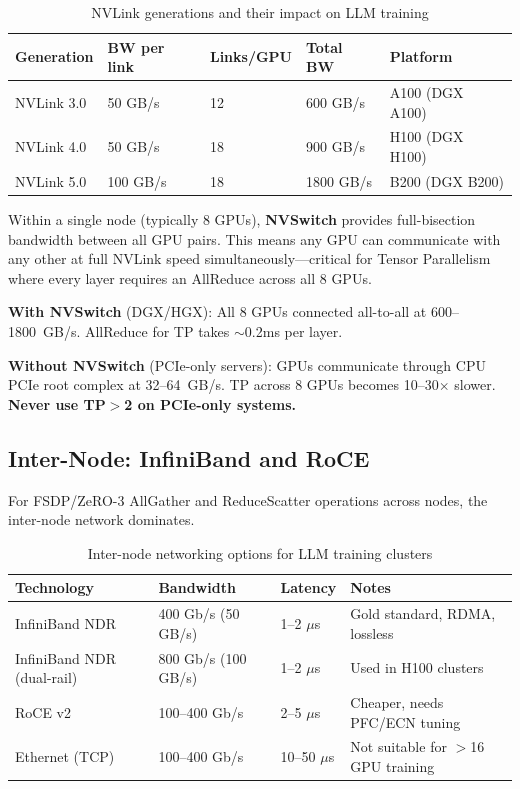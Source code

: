 \begin{table}[ht!]
\centering
\caption{NVLink generations and their impact on LLM training}
\begin{tabular}{@{}lp{3cm}p{3.2cm}p{3.2cm}p{3.5cm}@{}}
\toprule
\textbf{Generation} & \textbf{BW per link} & \textbf{Links/GPU} & \textbf{Total BW} & \textbf{Platform} \\
\midrule
NVLink 3.0 & 50 GB/s & 12 & 600 GB/s & A100 (DGX A100) \\
NVLink 4.0 & 50 GB/s & 18 & 900 GB/s & H100 (DGX H100) \\
NVLink 5.0 & 100 GB/s & 18 & 1800 GB/s & B200 (DGX B200) \\
\bottomrule
\end{tabular}
\end{table}

Within a single node (typically 8 GPUs), \textbf{NVSwitch} provides full-bisection bandwidth between all GPU pairs. This means any GPU can communicate with any other at full NVLink speed simultaneously---critical for Tensor Parallelism where every layer requires an AllReduce across all 8 GPUs.

\begin{keybox}
\textbf{With NVSwitch} (DGX/HGX): All 8 GPUs connected all-to-all at 600--1800~GB/s. AllReduce for TP takes $\sim$0.2ms per layer.

\textbf{Without NVSwitch} (PCIe-only servers): GPUs communicate through CPU PCIe root complex at 32--64~GB/s. TP across 8 GPUs becomes 10--30$\times$ slower. \textbf{Never use TP$>$2 on PCIe-only systems.}
\end{keybox}

\subsection{Inter-Node: InfiniBand and RoCE}
\label{inter-node-infiniband-and-roce}

For FSDP/ZeRO-3 AllGather and ReduceScatter operations across nodes, the inter-node network dominates.

\begin{table}[ht!]
\centering
\caption{Inter-node networking options for LLM training clusters}
{\small
\begin{tabular}{@{}llll@{}}
\toprule
\textbf{Technology} & \textbf{Bandwidth} & \textbf{Latency} & \textbf{Notes} \\
\midrule
InfiniBand NDR & 400 Gb/s (50 GB/s) & 1--2 $\mu$s & Gold standard, RDMA, lossless \\
InfiniBand NDR (dual-rail) & 800 Gb/s (100 GB/s) & 1--2 $\mu$s & Used in H100 clusters \\
RoCE v2 & 100--400 Gb/s & 2--5 $\mu$s & Cheaper, needs PFC/ECN tuning \\
Ethernet (TCP) & 100--400 Gb/s & 10--50 $\mu$s & Not suitable for $>$16 GPU training \\
\bottomrule
\end{tabular}
}
\end{table}

